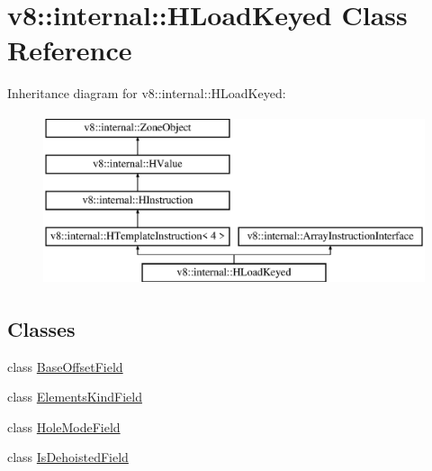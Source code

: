 \hypertarget{classv8_1_1internal_1_1_h_load_keyed}{}\section{v8\+:\+:internal\+:\+:H\+Load\+Keyed Class Reference}
\label{classv8_1_1internal_1_1_h_load_keyed}
Inheritance diagram for v8\+:\+:internal\+:\+:H\+Load\+Keyed\+:\begin{figure}[H]
\begin{center}
\leavevmode
\includegraphics[height=5.000000cm]{classv8_1_1internal_1_1_h_load_keyed}
\end{center}
\end{figure}
\subsection*{Classes}
\begin{DoxyCompactItemize}
\item 
class \hyperlink{classv8_1_1internal_1_1_h_load_keyed_1_1_base_offset_field}{Base\+Offset\+Field}
\item 
class \hyperlink{classv8_1_1internal_1_1_h_load_keyed_1_1_elements_kind_field}{Elements\+Kind\+Field}
\item 
class \hyperlink{classv8_1_1internal_1_1_h_load_keyed_1_1_hole_mode_field}{Hole\+Mode\+Field}
\item 
class \hyperlink{classv8_1_1internal_1_1_h_load_keyed_1_1_is_dehoisted_field}{Is\+Dehoisted\+Field}
\end{DoxyCompactItemize}
